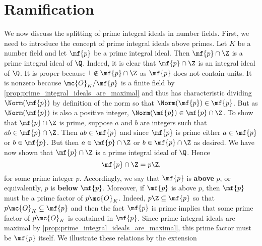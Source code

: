   \section{Ramification}
    We now discuss the splitting of prime integral ideals in number fields. First, we need to introduce the concept of prime integral ideals above primes. Let $K$ be a number field and let $\mf{p}$ be a prime integral ideal. Then $\mf{p} \cap \Z$ is a prime integral ideal of $\Q$. Indeed, it is clear that $\mf{p} \cap \Z$ is an integral ideal of $\Q$. It is proper because $1 \notin \mf{p} \cap \Z$ as $\mf{p}$ does not contain units. It is nonzero because $\mc{O}_{K}/\mf{p}$ is a finite field by \cref{prop:prime_integral_ideals_are_maximal} and thus has characteristic dividing $\Norm(\mf{p})$ by definition of the norm so that $\Norm(\mf{p}) \in \mf{p}$. But as $\Norm(\mf{p})$ is also a positive integer, $\Norm(\mf{p}) \in \mf{p} \cap \Z$. To show that $\mf{p} \cap \Z$ is prime, suppose $a$ and $b$ are integers such that $ab \in \mf{p} \cap \Z$. Then $ab \in \mf{p}$ and since $\mf{p}$ is prime either $a \in \mf{p}$ or $b \in \mf{p}$. But then $a \in \mf{p} \cap \Z$ or $b \in \mf{p} \cap \Z$ as desired. We have now shown that $\mf{p} \cap \Z$ is a prime integral ideal of $\Q$. Hence
    \[
      \mf{p} \cap \Z = p\Z,
    \]
    for some prime integer $p$. Accordingly, we say that $\mf{p}$ is \textbf{above} $p$, or equivalently, $p$ is \textbf{below} $\mf{p}$. Moreover, if $\mf{p}$ is above $p$, then $\mf{p}$ must be a prime factor of $p\mc{O}_{K}$. Indeed, $p\Z \subseteq \mf{p}$ so that $p\mc{O}_{K} \subseteq \mf{p}$ and then the fact $\mf{p}$ is prime implies that some prime factor of $p\mc{O}_{K}$ is contained in $\mf{p}$. Since prime integral ideals are maximal by \cref{prop:prime_integral_ideals_are_maximal}, this prime factor must be $\mf{p}$ itself. We illustrate these relations by the extension

    \begin{center}
    \end{center}

